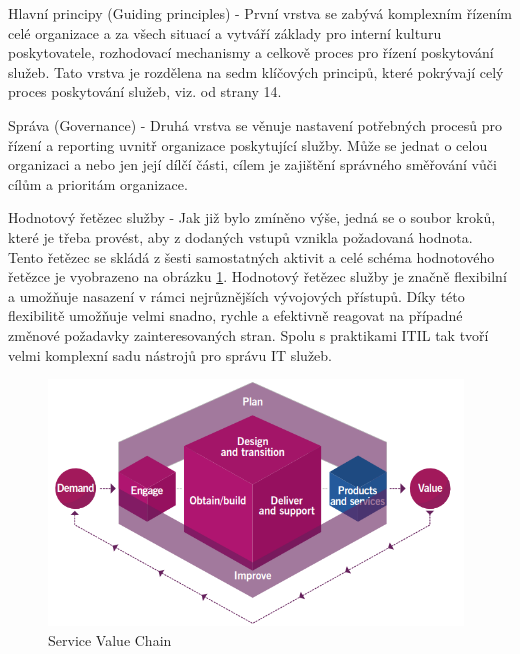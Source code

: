 \documentclass[
  digital,     %
  twoside,     %
  lof,         %
  lot,         %
]{fithesis4}
\begin{document}
\begin{compactitem}
    \item Hlavní principy (Guiding principles) - První vrstva se zabývá komplexním řízením celé organizace a za všech situací a vytváří základy pro interní kulturu poskytovatele, rozhodovací mechanismy a celkově proces pro řízení poskytování služeb. Tato vrstva je rozdělena na sedm klíčových principů, které pokrývají celý proces poskytování služeb, viz.  od strany 14.
    \item Správa (Governance) - Druhá vrstva se věnuje nastavení potřebných procesů pro řízení a reporting uvnitř organizace poskytující služby. Může se jednat o celou organizaci a nebo jen její dílčí části, cílem je zajištění správného směřování vůči cílům a prioritám organizace. 
    \item Hodnotový řetězec služby - Jak již bylo zmíněno výše, jedná se o soubor kroků, které je třeba provést, aby z dodaných vstupů vznikla požadovaná hodnota. Tento řetězec se skládá z šesti samostatných aktivit a celé schéma hodnotového řetězce je vyobrazeno na obrázku \ref{fig:value_chain}.
    Hodnotový řetězec služby je značně flexibilní a umožňuje nasazení v rámci nejrůznějších vývojových přístupů. Díky této flexibilitě umožňuje velmi snadno, rychle a efektivně reagovat na případné změnové požadavky zainteresovaných stran. Spolu s praktikami ITIL tak tvoří velmi komplexní sadu nástrojů pro správu IT služeb.\parencite[s.~21]{Cartlidge2020}

    \begin{figure}[h]
        \begin{center}
            \includegraphics[width=11cm]{img/value_chain.png}
        \end{center}
        \caption{Service Value Chain \parencite[s.~21]{Cartlidge2020}}
        \label{fig:value_chain}
    \end{figure} 
    

\end{compactitem}
\end{document}
